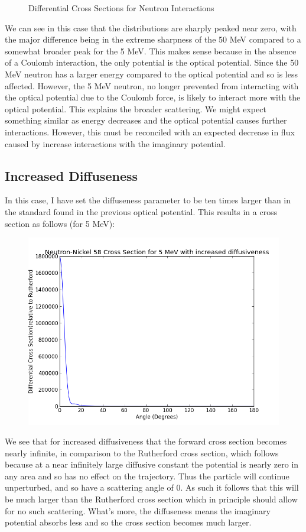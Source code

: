 \documentclass[paper=a4, fontsize=11pt]{scrartcl} %
\numberwithin{equation}{section} %
\numberwithin{figure}{section} %
\numberwithin{table}{section} %
\begin{document}
\begin{figure}[hbt]
        \caption{Differential Cross Sections for Neutron Interactions}
\end{figure}

We can see in this case that the distributions are sharply peaked near zero, with the major difference being in the extreme sharpness of the 50 MeV compared to a somewhat  broader peak for the 5 MeV. This makes sense because in the absence of a Coulomb interaction, the only potential is the optical potential. Since the 50 MeV neutron has a larger energy compared to the optical potential and so is less affected. However, the 5 MeV neutron, no longer prevented from interacting with the optical potential due to the Coulomb force, is likely to interact more with the optical potential. This explains the broader scattering. We might expect something similar as energy decreases and the optical potential causes further interactions. However, this must be reconciled with an expected decrease in flux caused by increase interactions with the imaginary potential.\\

\subsection{Increased Diffuseness}

In this case, I have set the diffuseness parameter to be ten times larger than in the standard found in the previous optical potential. This results in a cross section as follows (for 5 MeV):\\
\begin{figure}[!hbt]
\centering
\includegraphics[width=.4\textwidth]{NeutronDiff.png}
\end{figure}

We see that for increased diffusiveness that the forward cross section becomes nearly infinite, in comparison to the Rutherford cross section, which follows because at a near infinitely large diffusive constant the potential is nearly zero in any area and so has no effect on the trajectory. Thus the particle will continue unperturbed, and so have a scattering angle of 0. As such it follows that this will be much larger than the Rutherford cross section which in principle should allow for no such scattering. What's more, the diffuseness means the imaginary potential absorbs less and so the cross section becomes much larger.\\
\end{document}
